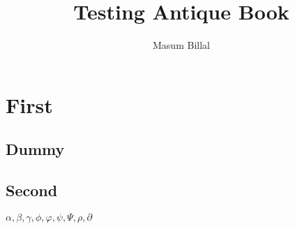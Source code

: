 \documentclass{antiquebook}
\author{Masum Billal}
\title{Testing Antique Book}
\begin{document}
	\frontmatter
	\maketitle
	\tableofcontents
	\mainmatter
	\chapter{First}
	\section{Dummy}
	\blindmathtrue
	\blindmathpaper
	\section{Second}
	\blindmathpaper
	$\alpha,\beta,\gamma,\phi,\varphi,\psi,\Psi,\rho,\partial$
\end{document}
